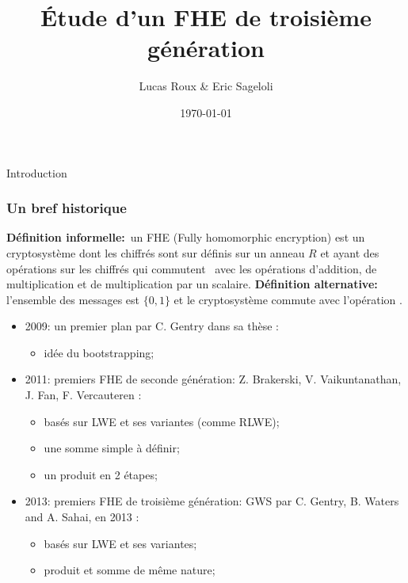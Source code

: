 \documentclass[10pt,xcolor={usenames,dvipsnames}]{beamer}
\title{\'Etude d'un FHE de troisième génération}
\date{\today}
\author{Lucas Roux \& Eric Sageloli}
\begin{document}
 \begin{frame} 
 \maketitle
 \end{frame}


\begin{section}{Introduction}

 \begin{frame} 
 \frametitle{Un bref historique}
\textbf{Définition informelle:} un FHE (Fully homomorphic encryption) est un cryptosystème dont les chiffrés 
 sont sur définis sur un anneau $R$ et ayant des opérations sur les chiffrés qui 
 \og commutent \fg~avec les opérations 
 d'addition, de multiplication et de multiplication par un scalaire. 
\textbf{Définition alternative:} l'ensemble des messages est $\{0,1\}$ et le cryptosystème commute  
avec l'opération .
\pause
\begin{itemize}
\item 2009: un premier plan par C. Gentry dans sa thèse :
\begin{itemize}
\item idée du bootstrapping;
\end{itemize}
\item 2011: premiers FHE de seconde génération: Z. Brakerski,  V. \nolinebreak Vaikuntanathan, J. Fan, F. Vercauteren :
	\begin{itemize}
	\item basés sur LWE et ses variantes (comme RLWE);
	\item une somme simple à définir;
	\item un produit en 2 étapes;
	\end{itemize}
\item 2013: premiers FHE de troisième génération: GWS par C. Gentry, B. Waters and A. Sahai, en 2013 :
	\begin{itemize}
	\item basés sur LWE et ses variantes;
	\item produit et somme de même nature;
	\end{itemize}
\end{itemize}
\end{frame} 

\end{section}
\end{document}
